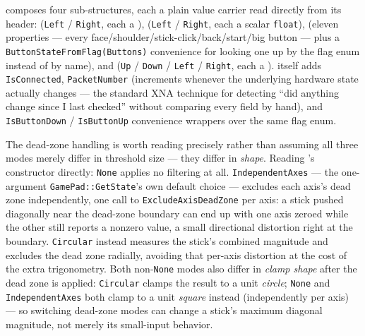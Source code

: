  composes four sub-structures, each a plain value carrier read directly
from its header:  (\texttt{Left} / \texttt{Right}, each a
),  (\texttt{Left} / \texttt{Right}, each a scalar
\texttt{float}),  (eleven  properties --- every
face/shoulder/stick-click/back/start/big button --- plus a \texttt{ButtonStateFromFlag(Buttons)}
convenience for looking one up by the  flag enum instead of by name), and
 (\texttt{Up} / \texttt{Down} / \texttt{Left} / \texttt{Right}, each a
).  itself adds \texttt{IsConnected},
\texttt{PacketNumber} (increments whenever the underlying hardware state actually changes ---
the standard XNA technique for detecting ``did anything change since I last checked'' without
comparing every field by hand), and \texttt{IsButtonDown} / \texttt{IsButtonUp} convenience
wrappers over the same  flag enum.

The dead-zone handling is worth reading precisely rather than assuming all three
 modes merely differ in threshold size --- they differ in
\emph{shape}. Reading 's constructor directly: \texttt{None}
applies no filtering at all. \texttt{IndependentAxes} --- the one-argument
\texttt{GamePad::GetState}'s own default choice --- excludes each axis's dead zone
independently, one call to \texttt{ExcludeAxisDeadZone} per axis: a stick pushed diagonally
near the dead-zone boundary can end up with one axis zeroed while the other still reports a
nonzero value, a small directional distortion right at the boundary. \texttt{Circular} instead
measures the stick's combined magnitude and excludes the dead zone radially, avoiding that
per-axis distortion at the cost of the extra trigonometry. Both non-\texttt{None} modes also
differ in \emph{clamp shape} after the dead zone is applied: \texttt{Circular} clamps the
result to a unit \emph{circle}; \texttt{None} and \texttt{IndependentAxes} both clamp to a unit
\emph{square} instead (independently per axis) --- so switching dead-zone modes can change a
stick's maximum diagonal magnitude, not merely its small-input behavior.

